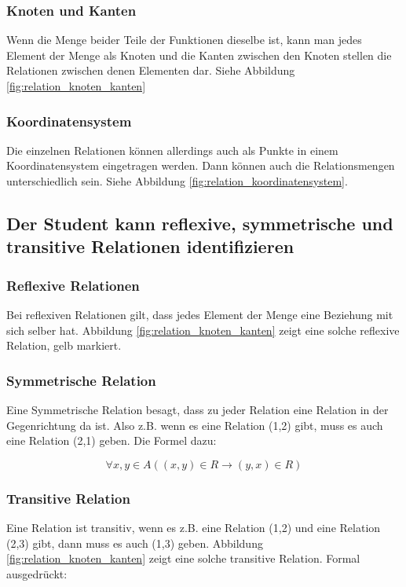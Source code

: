 \subsubsection{Knoten und Kanten}
Wenn die Menge beider Teile der Funktionen dieselbe ist, kann man jedes Element der Menge als Knoten und die Kanten zwischen den Knoten stellen die Relationen zwischen denen Elementen dar. Siehe Abbildung \ref{fig:relation_knoten_kanten}


\subsubsection{Koordinatensystem}
Die einzelnen Relationen können allerdings auch als Punkte in einem Koordinatensystem eingetragen werden. Dann können auch die Relationsmengen unterschiedlich sein. Siehe Abbildung \ref{fig:relation_koordinatensystem}.

\subsection{Der Student kann reflexive, symmetrische und transitive Relationen identifizieren}

\subsubsection{Reflexive Relationen}
Bei reflexiven Relationen gilt, dass jedes Element der Menge eine Beziehung mit sich selber hat. Abbildung \ref{fig:relation_knoten_kanten} zeigt eine solche reflexive Relation, gelb markiert.

\subsubsection{Symmetrische Relation}
Eine Symmetrische Relation besagt, dass zu jeder Relation eine Relation in der Gegenrichtung da ist. Also z.B. wenn es eine Relation (1,2) gibt, muss es auch eine Relation (2,1) geben. Die Formel dazu:

\begin{equation*}
    \forall x,y \in A ((x,y) \in R \to (y,x) \in R)
\end{equation*}

\subsubsection{Transitive Relation}
Eine Relation ist transitiv, wenn es z.B. eine Relation (1,2) und eine Relation (2,3) gibt, dann muss es auch (1,3) geben. Abbildung \ref{fig:relation_knoten_kanten} zeigt eine solche transitive Relation. Formal ausgedrückt:

